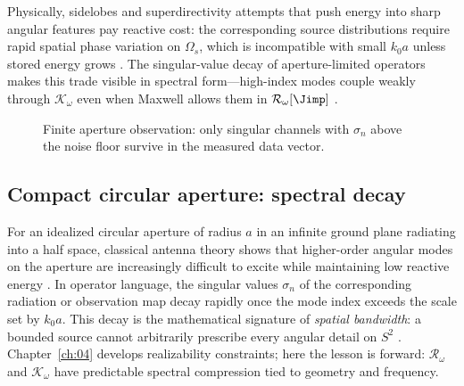 Physically, sidelobes and superdirectivity attempts that push energy into sharp angular features pay reactive cost: the corresponding source distributions require rapid spatial phase variation on $\Omega_s$, which is incompatible with small $k_0 a$ unless stored energy grows \cite{chu1948}. The singular-value decay of aperture-limited operators makes this trade visible in spectral form---high-index modes couple weakly through $\mathcal{K}_\omega$ even when Maxwell allows them in $\mathcal{R}_\omega[\Jimp]$ \cite{harrington2001}.

\begin{figure}[t]
\centering
{}
\caption{Finite aperture observation: only singular channels with $\sigma_n$ above the noise floor survive in the measured data vector.}
\label{fig:ch2.aperture-limited-observation}
\end{figure}

\subsection{Compact circular aperture: spectral decay}
\label{sec:ch02.7.3}

For an idealized circular aperture of radius $a$ in an infinite ground plane radiating into a half space, classical antenna theory shows that higher-order angular modes on the aperture are increasingly difficult to excite while maintaining low reactive energy \cite{harrington2001,chu1948}. In operator language, the singular values $\sigma_n$ of the corresponding radiation or observation map decay rapidly once the mode index exceeds the scale set by $k_0 a$. This decay is the mathematical signature of \emph{spatial bandwidth}: a bounded source cannot arbitrarily prescribe every angular detail on $S^2$ \cite{stratton1941}. Chapter~\ref{ch:04} develops realizability constraints; here the lesson is forward: $\mathcal{R}_\omega$ and $\mathcal{K}_\omega$ have predictable spectral compression tied to geometry and frequency.
